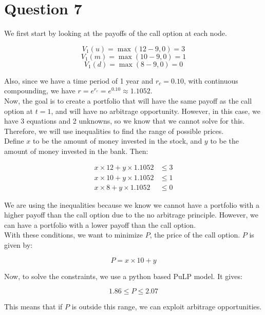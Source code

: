 \documentclass[a4paper]{article}
\begin{document}
\newpage
\section*{Question 7}




We first start by looking at the payoffs of the call option at each node.

\[ V_1(u) = \max(12 - 9, 0) = 3 \]
\[ V_1(m) = \max(10 - 9, 0) = 1 \]
\[ V_1(d) = \max(8 - 9, 0) = 0 \]

Also, since we have a time period of 1 year and $r_c = 0.10$, with continuous compounding, we have $r = e^{r_c} = e^{0.10} \approx 1.1052$. \\

Now, the goal is to create a portfolio that will have the same payoff as the call option at $t = 1$, and will have no arbitrage opportunity. However, in this case, we have 3 equations and 2 unknowns, so we know that we cannot solve for this. Therefore, we will use inequalities to find the range of possible prices. \\

Define $x$ to be the amount of money invested in the stock, and $y$ to be the amount of money invested in the bank. Then:

\begin{align}
    x \times 12 + y \times 1.1052 &\leq 3 \\
    x \times 10 + y \times 1.1052 &\leq 1 \\
    x \times 8 + y \times 1.1052 &\leq 0
\end{align}

We are using the inequalities because we know we cannot have a portfolio with a higher payoff than the call option due to the no arbitrage principle. However, we can have a portfolio with a lower payoff than the call option. \\

With these conditions, we want to minimize $P$, the price of the call option. $P$ is given by:

\[ P = x \times 10 + y \]

Now, to solve the constraints, we use a python based PuLP model. It gives:

\[ 1.86 \leq P \leq 2.07 \]

This means that if $P$ is outside this range, we can exploit arbitrage opportunities.
\end{document}
